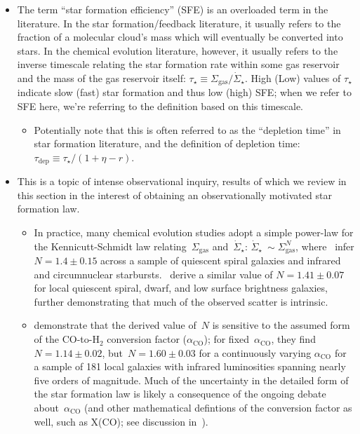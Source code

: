 \documentclass[fleqn, usenatbib]{mnras}
\begin{document}
\begin{itemize} 
	\item The term ``star formation efficiency'' (SFE) is an overloaded term in 
	the literature. In the star formation/feedback literature, it usually 
	refers to the fraction of a molecular cloud's mass which will eventually 
	be converted into stars. In the chemical evolution literature, however, it 
	usually refers to the inverse timescale relating the star formation rate 
	within some gas reservoir and the mass of the gas reservoir itself: 
	$\tau_\star \equiv \Sigma_\text{gas}/\dot{\Sigma}_\star$. High (Low) 
	values of $\tau_\star$ indicate slow (fast) star formation and thus low 
	(high) SFE; when we refer to SFE here, we're referring to the definition 
	based on this timescale. 
	\begin{itemize} 
		\item Potentially note that this is often referred to as the 
		``depletion time'' in star formation literature, and the 
		\citet{Weinberg2017} definition of depletion 
		time:~$\tau_\text{dep} \equiv \tau_\star/ (1 + \eta - r)$. 
	\end{itemize} 

	\item This is a topic of intense observational inquiry, results of which 
	we review in this section in the interest of obtaining an observationally 
	motivated star formation law. 
	\begin{itemize} 
		\item In practice, many chemical evolution studies adopt a simple 
		power-law for the Kennicutt-Schmidt law relating~$\Sigma_\text{gas}$ 
		and~$\dot{\Sigma}_\star$: $\dot{\Sigma}_\star~\sim 
		\Sigma_\text{gas}^N$, where~\citet{Kennicutt1998} infer 
		$N = 1.4 \pm 0.15$ across a sample of quiescent spiral galaxies and 
		infrared and circumnuclear starbursts.~\citet{delosReyes2019} derive a 
		similar value of $N = 1.41 \pm 0.07$ for local quiescent spiral, 
		dwarf, and low surface brightness galaxies, further demonstrating that 
		much of the observed scatter is intrinsic. 

		\item \citet{Liu2015} demonstrate that the derived value of~$N$ is 
		sensitive to the assumed form of the CO-to-H$_2$ conversion factor 
		($\alpha_\text{CO}$); for fixed~$\alpha_\text{CO}$, they find 
		$N = 1.14 \pm 0.02$, but~$N = 1.60 \pm 0.03$ for a continuously varying 
		$\alpha_\text{CO}$ for a sample of 181 local galaxies with infrared 
		luminosities spanning nearly five orders of magnitude. Much of the 
		uncertainty in the detailed form of the star formation law is likely 
		a consequence of the ongoing debate about~$\alpha_\text{CO}$ (and 
		other mathematical defintions of the conversion factor as well, such 
		as X(CO); see discussion in~\citealp{Kennicutt2012}). 


\end{itemize}
\end{itemize}
\end{document}
